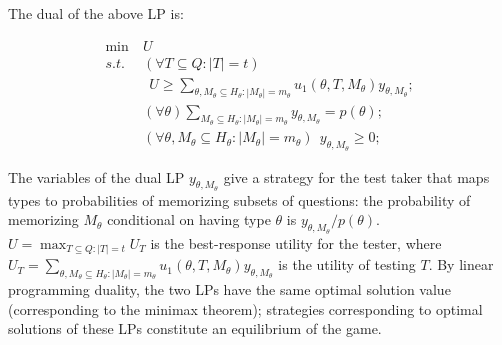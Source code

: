 \documentclass{article}
\begin{document}
The dual of the above LP is:

\begin{align}\label{eqn:dual-original}
  \min~&U\\
  s.t. \ &(\forall T \subseteq Q: |T| = t)\nonumber\\
	&~~  U \geq \sum_{\theta, M_\theta
    \subseteq H_\theta : |M_\theta| = m_\theta} u_1(\theta, T, M_\theta) y_{\theta, M_\theta};\nonumber\\
  &(\forall \theta) \sum_{M_\theta \subseteq H_\theta : |M_\theta| =
    m_\theta} y_{\theta, M_\theta} = p(\theta);\nonumber\\
  &(\forall \theta, M_\theta \subseteq H_\theta : |M_\theta| = m_\theta)~~ y_{\theta, M_\theta} \geq 0; \nonumber
\end{align}


The variables of the dual LP $y_{\theta, M_\theta}$ give a strategy
for the test taker that maps types to probabilities of memorizing subsets
of questions: the probability of memorizing $M_\theta$ conditional on
having type $\theta$ is $y_{\theta, M_\theta} / p(\theta)$. 
$U = \max_{T \subseteq Q: |T| = t} U_T$  is the best-response utility for
the tester, 
 where $U_T = \sum_{\theta, M_\theta
    \subseteq H_\theta : |M_\theta| = m_\theta} u_1(\theta, T, M_\theta)
  y_{\theta, M_\theta}$ is the utility of testing $T$.  By linear
  programming duality, the two LPs have the same optimal
  solution value (corresponding to the minimax theorem); 
strategies corresponding to optimal solutions of these LPs
constitute an equilibrium of the game.

\end{document}

